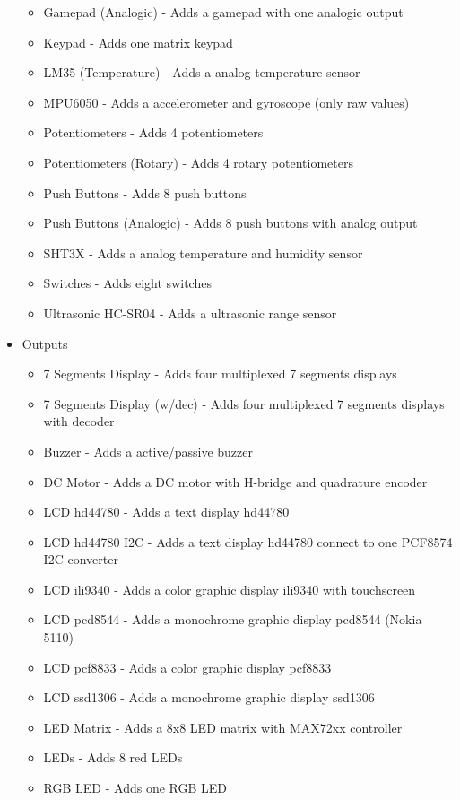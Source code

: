 \begin{itemize}
\begin{itemize}
  \item Gamepad (Analogic) - Adds a gamepad with one analogic output 
  \item Keypad -  Adds one matrix keypad
  \item LM35 (Temperature) - Adds a analog temperature sensor
  \item MPU6050 - Adds a accelerometer and gyroscope (only raw values)
  \item Potentiometers - Adds 4 potentiometers
  \item Potentiometers (Rotary) - Adds 4 rotary potentiometers
  \item Push Buttons - Adds 8 push buttons
  \item Push Buttons (Analogic) - Adds 8 push buttons with analog output
  \item SHT3X - Adds a analog temperature and humidity sensor
  \item Switches - Adds eight switches
  \item Ultrasonic HC-SR04 - Adds a ultrasonic range sensor
\end{itemize}
 \item{Outputs}
  \begin{itemize}
   \item 7 Segments Display -  Adds four multiplexed 7 segments displays
   \item 7 Segments Display (w/dec) -  Adds four multiplexed 7 segments displays with decoder
   \item Buzzer - Adds a active/passive buzzer
   \item DC Motor - Adds a DC motor with H-bridge and quadrature encoder 
   \item LCD hd44780 - Adds a text display hd44780
   \item LCD hd44780 I2C - Adds a text display hd44780 connect to one PCF8574 I2C converter
   \item LCD ili9340 - Adds a color graphic display ili9340 with touchscreen 
   \item LCD pcd8544 - Adds a monochrome graphic display pcd8544 (Nokia 5110)
   \item LCD pcf8833 - Adds a color graphic display pcf8833
   \item LCD ssd1306 - Adds a monochrome graphic display ssd1306
   \item LED Matrix - Adds a 8x8 LED matrix with MAX72xx controller 
   \item LEDs - Adds 8 red LEDs
   \item RGB LED - Adds one RGB LED 

\end{itemize}
\end{itemize}

